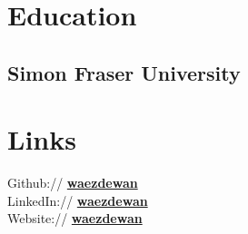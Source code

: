 \documentclass[letterpaper]{deedy-resume} %
\begin{document}




\begin{minipage}[t]{0.33\textwidth} %


\section{Education} 

\subsection{Simon Fraser University}


\sectionspace %


\section{Links} 

Github:// \href{https://github.com/waezdewan}{\bf waezdewan} \\
LinkedIn:// \href{https://www.linkedin.com/in/waezdewan/}{\bf waezdewan} \\
Website:// \href{https://waezdewan.github.io/}{\bf waezdewan} \\

\sectionspace %


\end{minipage}
\end{document}
